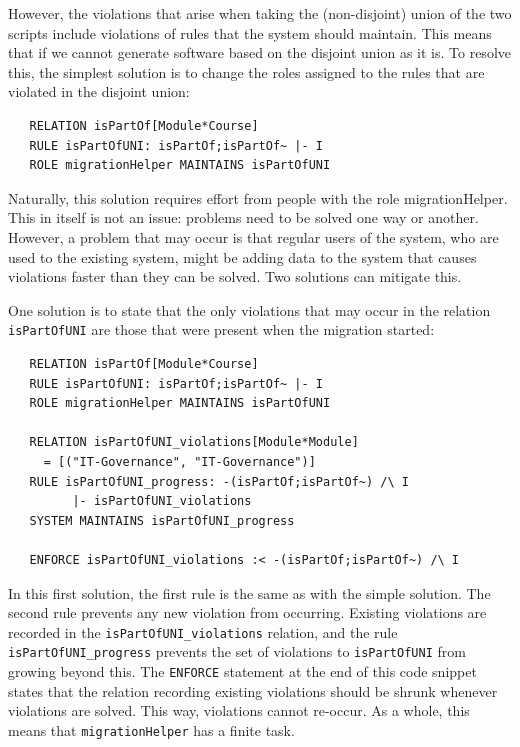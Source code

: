 \documentclass{elsarticle}
\begin{document}
However, the violations that arise when taking the (non-disjoint) union of the two scripts include violations of rules that the system should maintain.
This means that if we cannot generate software based on the disjoint union as it is.
To resolve this, the simplest solution is to change the roles assigned to the rules that are violated in the disjoint union:
\begin{verbatim}
   RELATION isPartOf[Module*Course]
   RULE isPartOfUNI: isPartOf;isPartOf~ |- I
   ROLE migrationHelper MAINTAINS isPartOfUNI
\end{verbatim}

Naturally, this solution requires effort from people with the role migrationHelper.
This in itself is not an issue: problems need to be solved one way or another.
However, a problem that may occur is that regular users of the system, who are used to the existing system, might be adding data to the system that causes violations faster than they can be solved.
Two solutions can mitigate this.

One solution is to state that the only violations that may occur in the relation \verb=isPartOfUNI= are those that were present when the migration started:
\begin{verbatim}
   RELATION isPartOf[Module*Course]
   RULE isPartOfUNI: isPartOf;isPartOf~ |- I
   ROLE migrationHelper MAINTAINS isPartOfUNI
   
   RELATION isPartOfUNI_violations[Module*Module]
     = [("IT-Governance", "IT-Governance")]
   RULE isPartOfUNI_progress: -(isPartOf;isPartOf~) /\ I
         |- isPartOfUNI_violations
   SYSTEM MAINTAINS isPartOfUNI_progress
   
   ENFORCE isPartOfUNI_violations :< -(isPartOf;isPartOf~) /\ I  
\end{verbatim}

In this first solution, the first rule is the same as with the simple solution.
The second rule prevents any new violation from occurring.
Existing violations are recorded in the \verb=isPartOfUNI_violations= relation, and the rule \verb=isPartOfUNI_progress= prevents the set of violations to \verb=isPartOfUNI= from growing beyond this.
The \verb=ENFORCE= statement at the end of this code snippet states that the relation recording existing violations should be shrunk whenever violations are solved.
This way, violations cannot re-occur.
As a whole, this means that \verb=migrationHelper= has a finite task.
\end{document}
